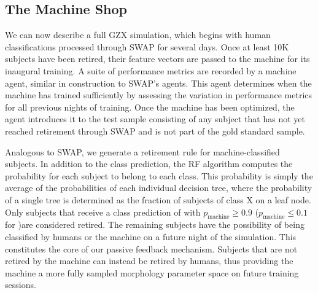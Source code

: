 \subsection{The Machine Shop}\label{chap4: machine shop}
We can now describe a full GZX simulation, which begins with human classifications 
processed through SWAP for several days.   
Once at least 10K subjects have been retired, their feature vectors are passed to 
the machine for its inaugural training. 
A suite of performance metrics are recorded by a machine agent, similar
in construction to SWAP's agents. This agent determines 
when the machine has trained sufficiently by assessing the variation
in performance metrics for all previous nights of training. 
Once the machine has been optimized, the agent introduces it to the test sample
consisting of any subject that has not yet reached retirement through SWAP 
and is not part of the gold standard sample.  

Analogous to SWAP, we generate a retirement rule for machine-classified subjects. In addition to the class prediction, the RF algorithm computes the probability for each subject to belong to each class.  This probability is simply the average of the probabilities of each individual decision tree, where the probability of a single tree is determined as the fraction of subjects of class X on a leaf node. Only subjects that receive a class prediction of \feat with $p_{\mathrm{machine}} \ge 0.9$ ($p_{\mathrm{machine}} \le 0.1$ for \notfeat)are considered retired. The remaining subjects have the possibility of being classified by humans or the machine on a future night of the simulation. This constitutes the core of our passive feedback mechanism. Subjects that are not retired by the machine can instead be retired by humans, thus providing the machine a more fully sampled morphology parameter space on future training sessions. 

